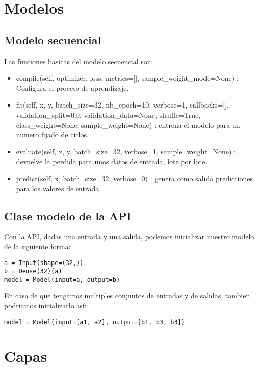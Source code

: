 \section{Modelos}
\subsection{Modelo secuencial}
Las funciones basicas del modelo secuencial son:
\begin{itemize}
\item compile(self, optimizer, loss, metrics=[], sample\_weight\_mode=None) : Configura el proceso de aprendizaje.
\item fit(self, x, y, batch\_size=32, nb\_epoch=10, verbose=1, callbacks=[], validation\_split=0.0, validation\_data=None, shuffle=True, class\_weight=None, sample\_weight=None) : entrena el modelo para un numero fijado de ciclos.
\item evaluate(self, x, y, batch\_size=32, verbose=1, sample\_weight=None) : devuelve la perdida para unos datos de entrada, lote por lote.
\item predict(self, x, batch\_size=32, verbose=0) : genera como salida predicciones para los valores de entrada.
\end{itemize}
\subsection{Clase modelo de la API}
Con la API, dadas una entrada y una salida, podemos inicializar nuestro modelo de la siguiente forma:
\begin{verbatim}
a = Input(shape=(32,))
b = Dense(32)(a)
model = Model(input=a, output=b)
\end{verbatim}
En caso de que tengamos multiples conjuntos de entradas y de salidas, tambien podriamos inicializarlo así:
\begin{verbatim}
model = Model(input=[a1, a2], output=[b1, b3, b3])
\end{verbatim}
\section{Capas}
